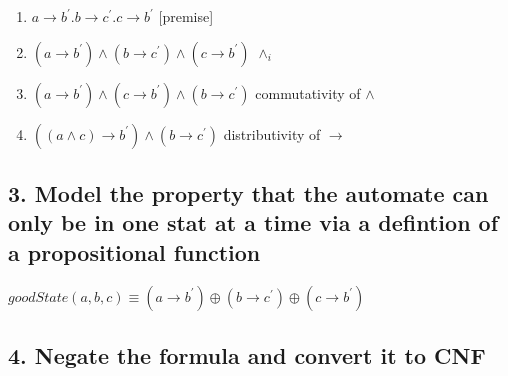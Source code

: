 \documentclass[a4paper, 13pt, draft]{report}
\begin{document}
	\begin{enumerate}		
		\item $ a \rightarrow b^\prime.b \rightarrow c^\prime.c \rightarrow b^\prime $ [premise]
		\item $ (a \rightarrow b^\prime) \wedge (b \rightarrow c^\prime) \wedge (c \rightarrow b^\prime) $ $ \wedge_i $
		\item $ (a \rightarrow b^\prime) \wedge (c \rightarrow b^\prime) \wedge (b \rightarrow c^\prime) $ commutativity of $ \wedge $
		\item $ ((a \wedge c) \rightarrow b^\prime) \wedge (b \rightarrow c^\prime) $ distributivity of $ \rightarrow $
	\end{enumerate}		

	\subsection*{3. Model the property that the automate can only be in one stat at a time via a defintion of a propositional function}

	\begin{center}
		$ goodState(a, b, c) \equiv (a \rightarrow b^\prime) \oplus (b \rightarrow c^\prime) \oplus (c \rightarrow b^\prime) $
	\end{center}

	\subsection*{4. Negate the formula and convert it to CNF} %
\end{document}
